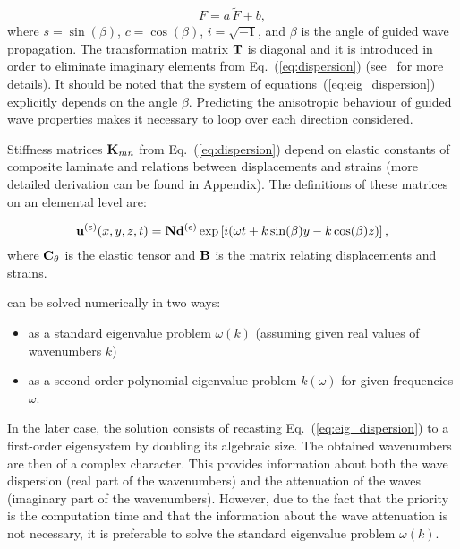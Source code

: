 	
\begin{equation}
	F = a \,  \tilde{F} + b,
	\end{equation}
	where  \(s=\sin(\beta)\), \(c=\cos(\beta)\), \(i=\sqrt{-1}\), and \(\beta\) is the angle 
	of guided wave propagation. The transformation matrix \(\mathbf{T}\) is diagonal and it 
	is introduced in order to eliminate imaginary elements from Eq.~(\ref{eq:dispersion}) 
	(see~\cite{Bartoli2006} for more details). It should be noted that the system of 
	equations~(\ref{eq:eig_dispersion}) explicitly depends on the angle \(\beta\). 
	Predicting the anisotropic behaviour of guided wave properties makes it necessary to 
	loop over each direction considered.
	
	Stiffness matrices \(\mathbf{K}_{mn}\) from Eq.~(\ref{eq:dispersion}) depend on elastic 
	constants of composite laminate and relations between displacements and strains 
	(more detailed derivation can be found in Appendix). The definitions of these matrices 
	on an elemental level are:
	
	
\begin{equation}
	 \mathbf{u}^{(e)}(x,y,z,t) = \mathbf{N} \mathbf{d}^{(e)} \exp \left[ i (\omega t + k \sin (\beta) y - k \cos (\beta) z)\right],
	 \end{equation}
	where \(\mathbf{C}_{\theta}\) is the elastic tensor and \(\mathbf{B}\) is the matrix relating 
	displacements and strains.
		
	
	 can be solved numerically in two ways:
	
	\begin{itemize}
		\item as a standard eigenvalue problem \(\omega(k)\) (assuming given real values 
		of wavenumbers \(k\))
		\item as a second-order polynomial eigenvalue problem \(k(\omega)\) for given 
		frequencies \(\omega\).
	\end{itemize}
In the later case, the solution consists of recasting Eq.~(\ref{eq:eig_dispersion}) to a 
first-order eigensystem by doubling its algebraic size.  The obtained wavenumbers are 
then of a complex character. This provides information about both the wave dispersion 
(real part of the wavenumbers) and the attenuation of the waves (imaginary part of the 
wavenumbers).  However, due to the fact that the priority is the computation time and 
that the information about the wave attenuation is not necessary, it is preferable to 
solve the standard eigenvalue problem \(\omega(k)\).

